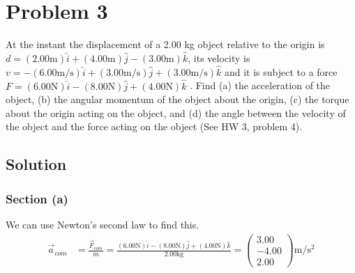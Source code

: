 \documentclass[12pt]{article}
\begin{document}
\pagebreak
\section{Problem 3}
At the instant the displacement of a 2.00 kg object relative to the origin is \(d = (2.00 \unit{\meter})\hat{i} + (4.00 \unit{\meter})\hat{j} - (3.00 \unit{\meter})\hat{k}\), its velocity is \(v = -(6.00 \unit{\meter/\second})\hat{i} + (3.00 \unit{\meter/\second})\hat{j} + (3.00 \unit{\meter/\second})\hat{k}\) and it is subject to a force \(F = (6.00 \unit{\newton})\hat{i} - (8.00 \unit{\newton})\hat{j} + (4.00 \unit{\newton})\hat{k}\) . Find (a) the acceleration of the object, (b) the angular momentum of the object about the origin, (c) the torque about the origin acting on the object, and (d) the angle between the velocity of the object and the force acting on the object (See HW 3, problem 4).

\subsection{Solution}
\subsubsection{Section (a)}
We can use Newton's second law to find this.
\begin{align}
    \vec{a}_{com}   &=  \frac{\vec{F}_{com}}{m}
        =   \frac{(6.00 \unit{\newton})\hat{i} - (8.00 \unit{\newton})\hat{j} + (4.00 \unit{\newton})\hat{k}}{2.00\unit{\kilo\gram}}
        =   \boxed{\begin{pmatrix}3.00\\-4.00\\2.00\end{pmatrix}\unit{\meter/\second^2}}
\end{align}
\end{document}
